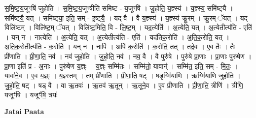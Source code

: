 \documentclass[17pt]{extarticle}
\begin{document}
स॒मि॒ष्ट॒य॒जूꣳषि॑ जुहोति । स॒मि॒ष्ट॒य॒जूꣳषीति॑ समिष्ट - य॒जूꣳषि॑ । जु॒हो॒ति॒ य॒ज्ञ्स्य॑ । य॒ज्ञ्स्य॒ समि॑ष्ट्‍यै । समि॑ष्ट्‍यै॒ यत् । समि॑ष्ट्‍या॒ इति॒ सम् - इ॒ष्ट्‍यै॒ । यद् वै । वै य॒ज्ञ्स्य॑ । य॒ज्ञ्स्य॑ क्रू॒रम् । क्रू॒रम् ॅयत् । यद् विलि॑ष्टम् । विलि॑ष्ट॒म् ॅयत् । विलि॑ष्ट॒मिति॒ वि - लि॒ष्ट॒म् । यद॒त्येति॑ । अ॒त्येति॒ यत् । अ॒त्येतीत्य॑ति - एति॑ । यन् न । नात्येति॑ । अ॒त्येति॒ यत् । अ॒त्येतीत्य॑ति - एति॑ । यद॑तिक॒रोति॑ । अ॒ति॒क॒रोति॒ यत् । अ॒ति॒क॒रोतीत्य॑ति - क॒रोति॑ । यन् न । नापि॑ । अपि॑ क॒रोति॑ । क॒रोति॒ तत् । तदे॒व । ए॒व तैः । तैः प्री॑णाति । प्री॒णा॒ति॒ नव॑ । नव॑ जुहोति । जु॒हो॒ति॒ नव॑ । नव॒ वै । वै पुरु॑षे । पुरु॑षे प्रा॒णाः । प्रा॒णाः पुरु॑षेण । प्रा॒णा इति॑ प्र - अ॒नाः । पुरु॑षेण य॒ज्ञ्ः । य॒ज्ञ्ः सम्मि॑तः । सम्मि॑तो॒ यावान्॑ । सम्मि॑त॒ इति॒ सम् - मि॒तः॒ । यावा॑ने॒व । ए॒व य॒ज्ञ्ः । य॒ज्ञ्स्तम् । तम् प्री॑णाति । प्री॒णा॒ति॒ षट् । षडृग्मि॑याणि । ऋग्मि॑याणि जुहोति । जु॒हो॒ति॒ षट् । षड् वै । वा ऋ॒तवः॑ । ऋ॒तव॑ ऋ॒तून् । ऋ॒तूने॒व । ए॒व प्री॑णाति । प्री॒णा॒ति॒ त्रीणि॑ । त्रीणि॒ यजूꣳ॑षि । यजूꣳ॑षि॒ त्रयः॑ \newline

\textbf{Jatai Paata} \newline
\end{document}
